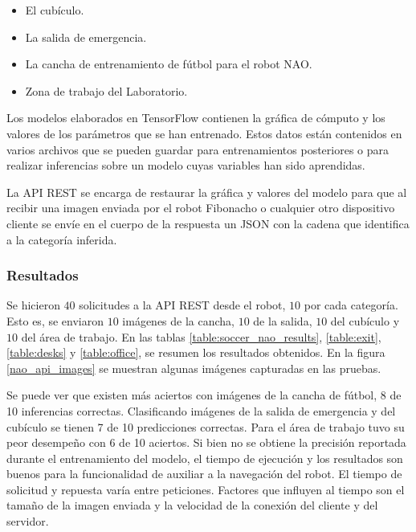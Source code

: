 \begin{itemize}
    \item El cubículo.
    \item La salida de emergencia.
    \item La cancha de entrenamiento de fútbol para el robot NAO.
    \item Zona de trabajo del Laboratorio.
\end{itemize}

Los modelos elaborados en TensorFlow contienen la gráfica de cómputo
y los valores de los parámetros que se han entrenado. Estos datos
están contenidos en varios archivos que se pueden guardar para
entrenamientos posteriores o para realizar inferencias sobre 
un modelo cuyas variables han sido aprendidas.


La API REST se encarga de restaurar la gráfica y valores del modelo para que al recibir una imagen enviada por el robot
Fibonacho  o cualquier otro
dispositivo cliente se envíe en el cuerpo de la respuesta
un JSON con la cadena que identifica a la categoría 
inferida.

\subsubsection{Resultados}

Se hicieron $40$ solicitudes a la API REST desde el robot,
$10$ por cada categoría. Esto es, se enviaron
$10$ imágenes de la cancha, $10$ de la salida,
$10$ del cubículo y $10$ del área de trabajo.
En las tablas \ref{table:soccer_nao_results},
\ref{table:exit}, \ref{table:desks} y
\ref{table:office}, se resumen los resultados obtenidos.
En la figura \ref{nao_api_images} se muestran algunas imágenes capturadas en las pruebas.


Se puede ver que existen más aciertos
con imágenes de la cancha de fútbol, 8 de 10 inferencias correctas.
Clasificando imágenes de la salida de emergencia
y del cubículo se tienen 7 de 10 predicciones correctas.
Para el área de trabajo tuvo su peor desempeño con 6 de
10 aciertos. Si bien no se obtiene
la precisión reportada durante el
entrenamiento del modelo, el tiempo
de ejecución y los
resultados son buenos
para la funcionalidad de
auxiliar a la navegación del robot.
El tiempo de solicitud y repuesta varía entre peticiones.
Factores que influyen al tiempo son el tamaño de la 
imagen enviada y la velocidad de la conexión del cliente
y del servidor. 

